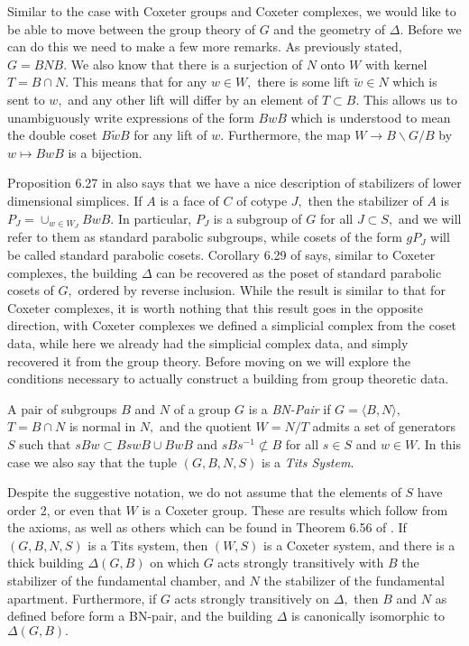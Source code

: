 \documentclass[class=book, crop=false,12 pt]{standalone}
\begin{document}
Similar to the case with Coxeter groups and Coxeter complexes, we would like to be able to move between the group theory of $G$ and the geometry of $\Delta.$ Before we can do this we need to make a few more remarks. As previously stated, $G=BNB.$ We also know that there is a surjection of $N$ onto $W$ with kernel $T=B\cap N.$ This means that for any $w\in W,$ there is some lift $\tilde{w}\in N$ which is sent to $w,$ and any other lift will differ by an element of $T\subset B.$ This allows us to unambiguously write expressions of the form $BwB$ which is understood to mean the double coset $B\tilde{w}B$ for any lift of $w.$ Furthermore, the map $W\to B\backslash G/B$ by $w\mapsto BwB$ is a bijection.

Proposition 6.27 in \cite{buildings} also says that we have a nice description of stabilizers of lower dimensional simplices. If $A$ is a face of $C$ of cotype $J,$ then the stabilizer of $A$ is $P_J=\cup_{w\in W_J}BwB.$ In particular, $P_J$ is a subgroup of $G$ for all $J\subset S,$ and we will refer to them as standard parabolic subgroups, while cosets of the form $gP_J$ will be called standard parabolic cosets. Corollary 6.29 of \cite{buildings} says, similar to Coxeter complexes, the building $\Delta$ can be recovered as the poset of standard parabolic cosets of $G,$ ordered by reverse inclusion. While the result is similar to that for Coxeter complexes, it is worth nothing that this result goes in the opposite direction, with Coxeter complexes we defined a simplicial complex from the coset data, while here we already had the simplicial complex data, and simply recovered it from the group theory. Before moving on we will explore the conditions necessary to actually construct a building from group theoretic data.

\begin{defn}
	\label{defn:bnpair}
	A pair of subgroups $B$ and $N$ of a group $G$ is a \emph{BN-Pair} if $G=\langle B,N\rangle,$ $T=B\cap N$ is normal in $N,$ and the quotient $W=N/T$ admits a set of generators $S$ such that $sBw\subset BswB\cup BwB$ and $sBs^{-1}\not\subset B$ for all $s\in S$ and $w\in W.$ In this case we also say that the tuple $(G,B,N,S)$ is a \emph{Tits System}.
\end{defn}

Despite the suggestive notation, we do not assume that the elements of $S$ have order 2, or even that $W$ is a Coxeter group. These are results which follow from the axioms, as well as others which can be found in Theorem 6.56 of \cite{buildings}. If $(G,B,N,S)$ is a Tits system, then $(W,S)$ is a Coxeter system, and there is a thick building $\Delta(G,B)$ on which $G$ acts strongly transitively with $B$ the stabilizer of the fundamental chamber, and $N$ the stabilizer of the fundamental apartment. Furthermore, if $G$ acts strongly transitively on $\Delta,$ then $B$ and $N$ as defined before form a BN-pair, and the building $\Delta$ is canonically isomorphic to $\Delta(G,B).$
\end{document}
